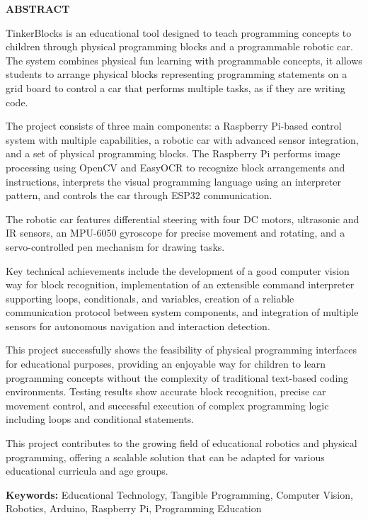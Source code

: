 \begin{center}
    \Large \textbf{ABSTRACT}
    \end{center}
    
    \vspace{1cm}
    
    TinkerBlocks is an educational tool designed to teach programming concepts to children through physical programming blocks and a programmable robotic car. The system combines physical fun learning with programmable concepts, it allows students to arrange physical blocks representing programming statements on a grid board to control a car that performs multiple tasks, as if they are writing code.
    
    The project consists of three main components: a Raspberry Pi-based control system with multiple capabilities, a robotic car with advanced sensor integration, and a set of physical programming blocks. The Raspberry Pi performs image processing using OpenCV and EasyOCR to recognize block arrangements and instructions, interprets the visual programming language using an interpreter pattern, and controls the car through ESP32 communication.
    
    The robotic car features differential steering with four DC motors, ultrasonic and IR sensors, an MPU-6050 gyroscope for precise movement and rotating, and a servo-controlled pen mechanism for drawing tasks.
    
    Key technical achievements include the development of a good computer vision way for block recognition, implementation of an extensible command interpreter supporting loops, conditionals, and variables, creation of a reliable communication protocol between system components, and integration of multiple sensors for autonomous navigation and interaction detection.
    
    This project successfully shows the feasibility of physical programming interfaces for educational purposes, providing an enjoyable way for children to learn programming concepts without the complexity of traditional text-based coding environments. Testing results show accurate block recognition, precise car movement control, and successful execution of complex programming logic including loops and conditional statements.
    
    This project contributes to the growing field of educational robotics and physical programming, offering a scalable solution that can be adapted for various educational curricula and age groups.
    
    \textbf{Keywords:} Educational Technology, Tangible Programming, Computer Vision, Robotics, Arduino, Raspberry Pi, Programming Education